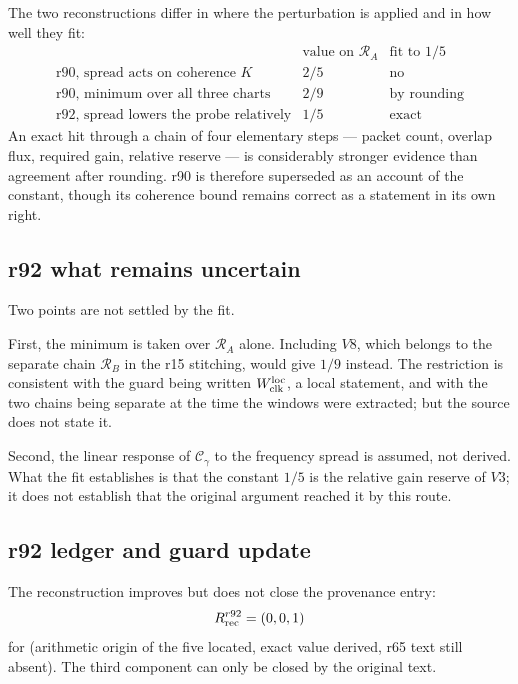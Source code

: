 The two reconstructions differ in where the perturbation is applied and in how well they fit:
\[
\begin{array}{l|c|c}
& \text{value on }\mathcal R_A & \text{fit to }1/5\\
\hline
\text{r90, spread acts on coherence }K & 2/5 & \text{no}\\
\text{r90, minimum over all three charts} & 2/9 & \text{by rounding}\\
\text{r92, spread lowers the probe relatively} & 1/5 & \text{exact}
\end{array}
\]
An exact hit through a chain of four elementary steps --- packet count, overlap flux, required
gain, relative reserve --- is considerably stronger evidence than agreement after rounding.
r90 is therefore superseded as an account of the constant, though its coherence bound remains
correct as a statement in its own right.

\subsection*{r92 what remains uncertain}
\label{subsec:r92-uncertain}

Two points are not settled by the fit.

First, the minimum is taken over \(\mathcal R_A\) alone.  Including \(V8\), which belongs to
the separate chain \(\mathcal R_B\) in the r15 stitching, would give \(1/9\) instead.  The
restriction is consistent with the guard being written \(W_{\rm clk}^{\rm loc}\), a local
statement, and with the two chains being separate at the time the windows were extracted;
but the source does not state it.

Second, the linear response of \(\mathcal C_\gamma\) to the frequency spread is assumed, not
derived.  What the fit establishes is that the constant \(1/5\) is the relative gain reserve
of \(V3\); it does not establish that the original argument reached it by this route.

\subsection*{r92 ledger and guard update}
\label{subsec:r92-ledger-guard}

The reconstruction improves but does not close the provenance entry:
\[
R_{\rm rec}^{r92}=(0,0,1)
\]
for (arithmetic origin of the five located, exact value derived, r65 text still absent).  The
third component can only be closed by the original text.

